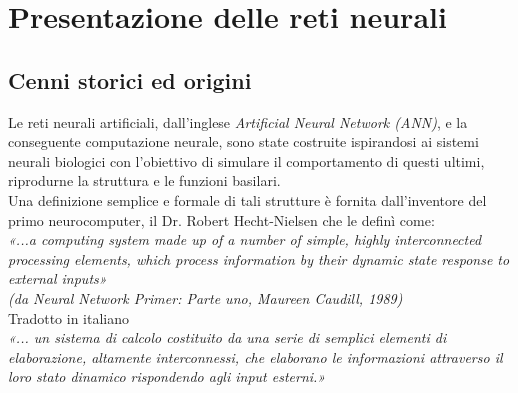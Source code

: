 \documentclass[12pt,a4paper,oneside]{book}
\begin{document}
\restoregeometry


	
\chapter{ Presentazione delle reti neurali }
	
	
	\section{Cenni storici ed origini}
		Le reti neurali artificiali, dall'inglese \textit{Artificial Neural Network (ANN)}, e la conseguente computazione neurale, sono state costruite ispirandosi ai sistemi neurali biologici con l'obiettivo di simulare il comportamento di questi ultimi, riprodurne la struttura e le funzioni basilari.\\
		Una definizione semplice e formale di tali strutture è fornita dall'inventore del primo neurocomputer, il Dr. Robert Hecht-Nielsen che le definì come: \\
		
		\textit{«...a computing system made up of a number of simple, highly interconnected processing elements, which process information by their dynamic state response to external inputs»}\\
		\textit{(da Neural Network Primer: Parte uno, Maureen Caudill, 1989)}\\
		
		Tradotto in italiano \\
		\textit{«... un sistema di calcolo costituito da una serie di semplici elementi di elaborazione, altamente interconnessi, che elaborano le informazioni attraverso il loro stato dinamico rispondendo agli input esterni.»}\\
		
\end{document}
